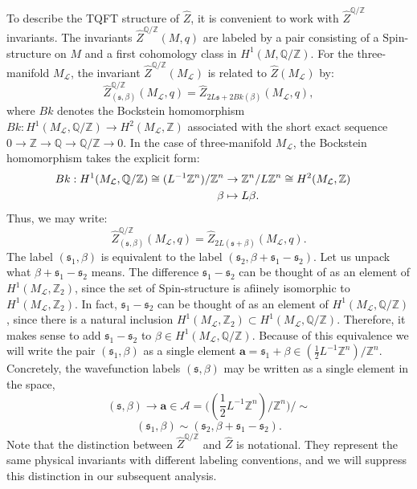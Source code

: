 \documentclass{article}
\newcommand{\Z}{{\mathbb Z}}
\newcommand{\Q}{{\mathbb Q}}
\def\be{\begin{equation}}
\def\ee{\end{equation}}
\numberwithin{corollary}{theorem}
\numberwithin{corollary}{proposition}
\begin{document}
To describe the TQFT structure of $\hat{Z}$, it is convenient to work with $\hat{Z}^{\Q/\Z}$ invariants. The invariants $\hat{Z}^{\Q/\Z}(M,q)$ are labeled by a pair consisting of a $\mathrm{Spin}$-structure on $M$ and a first cohomology class in $H^{1}(M,\Q/\Z)$. For the three-manifold $M_{\mathcal{L}}$, the invariant $\hat{Z}^{\Q/\Z}(M_{\mathcal{L}})$ is related to $\hat{Z}(M_{\mathcal{L}})$ by:
\be 
\hat{Z}^{\Q/\Z}_{(\mathfrak{s},\beta)}(M_{\mathcal{L}},q) = \hat{Z}_{ 2 L \mathfrak{s} + 2 Bk(\beta) }(M_{\mathcal{L}},q),
\ee 
where $Bk$ denotes the Bockstein homomorphism $Bk: H^{1}(M_{\mathcal{L}},\Q/\Z) \rightarrow H^{2}(M_{\mathcal{L}},\Z)$ associated with the short exact sequence $0 \rightarrow \Z \rightarrow \Q \rightarrow \Q / \Z \rightarrow 0$. In the case of three-manifold $M_{\mathcal{L}}$, the Bockstein homomorphism takes the explicit form:
\begin{align}
    Bk: H^{1}(M_{\mathcal{L}},\Q/\Z) \cong (L^{-1}\Z^{n}) / \Z^{n} &\rightarrow \Z^{n} / L \Z^{n} \cong H^{2}(M_{\mathcal{L}},\Z) \endline
    \beta &\mapsto L \beta.
\end{align}
Thus, we may write:
\be 
\hat{Z}^{\Q/\Z}_{(\mathfrak{s},\beta)}(M_{\mathcal{L}},q) = \hat{Z}_{2L( \mathfrak{s}+ \beta)}(M_{\mathcal{L}},q).
\ee
The label $(\mathfrak{s}_{1},\beta)$ is equivalent to the label $ (\mathfrak{s}_{2},\beta + \mathfrak{s}_{1}- \mathfrak{s}_{2} )$. Let us unpack what $\beta + \mathfrak{s}_{1}- \mathfrak{s}_{2}$ means. The difference $\mathfrak{s}_{1}- \mathfrak{s}_{2}$ can be thought of as an element of $H^{1}(M_{\mathcal{L}},\Z_{2})$, since the set of $\mathrm{Spin}$-structure is afiinely isomorphic to $H^{1}(M_{\mathcal{L}},\Z_{2})$. In fact, $\mathfrak{s}_{1}- \mathfrak{s}_{2}$ can be thought of as an element of $H^{1}(M_{\mathcal{L}},\Q/\Z)$, since there is a natural inclusion $H^{1}(M_{\mathcal{L}},\Z_{2}) \subset H^{1}(M_{\mathcal{L}},\Q/\Z)$. Therefore, it makes sense to add $\mathfrak{s}_{1}- \mathfrak{s}_{2}$ to $\beta \in H^{1}(M_{\mathcal{L}},\Q/\Z)$. Because of this equivalence we will write the pair $(\mathfrak{s}_{1},\beta)$ as a single element $ \mathbf{a} =\mathfrak{s}_{1} + \beta \in (\frac{1}{2} L^{-1}\Z^{n} )/ \Z^{n}  $. Concretely, the wavefunction labels $(\mathfrak{s},\beta)$ may be written as a single element in the space,
$$(\mathfrak{s},\beta) \longrightarrow \mathbf{a} \in \mathcal{A} = \bigg( (\frac{1}{2} L^{-1}\Z^{n} )/ \Z^{n} \bigg)/\sim$$
$$(\mathfrak{s}_{1},\beta)  \sim (\mathfrak{s}_{2},\beta + \mathfrak{s}_{1}- \mathfrak{s}_{2}) .$$
Note that the distinction between $\hat{Z}^{\Q/\Z}$ and $\hat{Z}$ is notational. They represent the same physical invariants with different labeling conventions, and we will suppress this distinction in our subsequent analysis.
\end{document}
